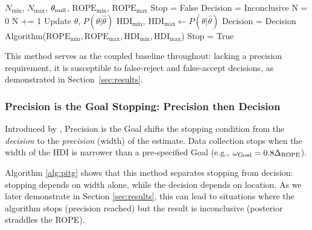 \begin{algorithm}
    \caption{HDI+ROPE algorithm (highlighted: the stopping condition)}\label{alg:hdi_rope}
    \begin{algorithmic}
    \Require $N_\mathrm{min}$, $N_\mathrm{max}$, $\theta_{\rm null}$, $\mathrm{ROPE}_\mathrm{min}$, $\mathrm{ROPE}_\mathrm{max}$
    \State Stop = False
    \State Decision = Inconclusive
    \State N = 0
    \State N += 1 
    \State Update $\hat\theta$, $P(\theta|\hat\theta)$ 
    \State $\mathrm{HDI}_\mathrm{min}, \ \mathrm{HDI}_\mathrm{max}  \gets P(\theta|\hat\theta)$
        \State Decision = Decision Algorithm($\mathrm{ROPE}_\mathrm{min}, \mathrm{ROPE}_\mathrm{max}, \mathrm{HDI}_\mathrm{min}, \mathrm{HDI}_\mathrm{max}$)
            \State \HiLi Stop = True 
        \EndIf
    \EndIf
    \EndWhile
    \end{algorithmic}
\end{algorithm}

This method serves as the coupled baseline throughout: lacking a precision requirement,
it is susceptible to false-reject and false-accept decisions, as demonstrated in
Section~\ref{sec:results}.

\subsubsection{Precision is the Goal Stopping: Precision then Decision}\label{sec:pitg}

Introduced by \cite{kruschke2015doing}, Precision is the Goal shifts the stopping condition
from the \textit{decision} to the \textit{precision} (width) of the estimate.
Data collection stops when the width of the HDI is narrower than a pre-specified Goal
(e.g., $\omega_{\rm Goal}=0.8 \Delta_{\rm ROPE}$).

Algorithm \ref{alg:pitg} shows that this method separates stopping from decision:
stopping depends on width alone, while the decision depends on location.
As we later demonstrate in Section \ref{sec:results}, this can lead to situations where
the algorithm stops (precision reached) but the result is inconclusive (posterior straddles the ROPE).

